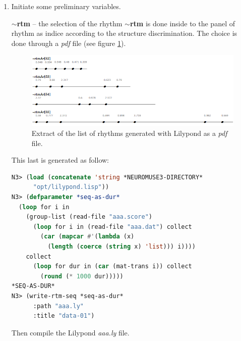 \begin{enumerate}
 \item Initiate some preliminary variables.


\textbf{$\sim$rtm} -- the selection of the rhythm \textbf{$\sim$rtm} is done inside to the panel of rhythm as indice according to the structure discrimination. The choice is done through a \textsl{pdf} file (see figure \ref{rtm}). 

 \begin{figure}[htbp]
\begin{center}
\includegraphics[scale=0.43]{img/6710} 
\caption{Extract of the list of rhythms generated with Lilypond as a \textsl{pdf} file.}
\label{rtm}
\end{center}
\end{figure}
 
This last is generated as follow:
 \begin{lstlisting}[basicstyle=\footnotesize\ttfamily,language=Lisp]
N3> (load (concatenate 'string *NEUROMUSE3-DIRECTORY* 
      "opt/lilypond.lisp"))
N3> (defparameter *seq-as-dur* 
  (loop for i in 
    (group-list (read-file "aaa.score") 
      (loop for i in (read-file "aaa.dat") collect 
        (car (mapcar #'(lambda (x) 
          (length (coerce (string x) 'list))) i)))) 
    collect 
      (loop for dur in (car (mat-trans i)) collect 
        (round (* 1000 dur)))))
*SEQ-AS-DUR*
N3> (write-rtm-seq *seq-as-dur* 
      :path "aaa.ly" 
      :title "data-01")
\end{lstlisting}
Then compile the Lilypond \textsl{aaa.ly} file.%


\end{enumerate}
